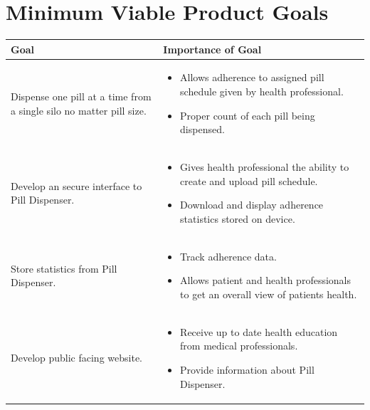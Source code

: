 \documentclass[12pt,titlepage]{article}
\begin{document}
\section{Minimum Viable Product Goals}
\begin{center}
\begin{adjustbox}{max width=.75\textwidth}
\small
\begin{tabular}{|p{}|p{}|}
 \hline
 \textbf{Goal} & \textbf{Importance of Goal} \\ 
 \hline
Dispense one pill at a time from a single silo no matter pill size. &
\begin{itemize}[noitemsep,topsep=0pt,leftmargin=13pt]
  \item Allows adherence to assigned pill schedule given by health professional.
  \item Proper count of each pill being dispensed.
  \end{itemize}\\ 
 \hline
Develop an secure interface to Pill Dispenser. & 
\begin{itemize}[noitemsep,topsep=0pt,leftmargin=13pt]
  \item Gives health professional the ability to create and upload pill schedule.
  \item Download and display adherence statistics stored on device.
  \end{itemize}\\ 
 \hline
Store statistics from Pill Dispenser. & 
\begin{itemize}[noitemsep,topsep=0pt,leftmargin=13pt]
  \item Track adherence data.
  \item Allows patient and health professionals to get an overall view of patients health.
  \end{itemize}\\ 
 \hline
Develop public facing website.  & 
\begin{itemize}[noitemsep,topsep=0pt,leftmargin=13pt]
  \item Receive up to date health education from medical professionals.
  \item Provide information about Pill Dispenser.
  \end{itemize}\\ 
 \hline
\end{tabular}
\end{adjustbox}
\end{center}
\end{document}
